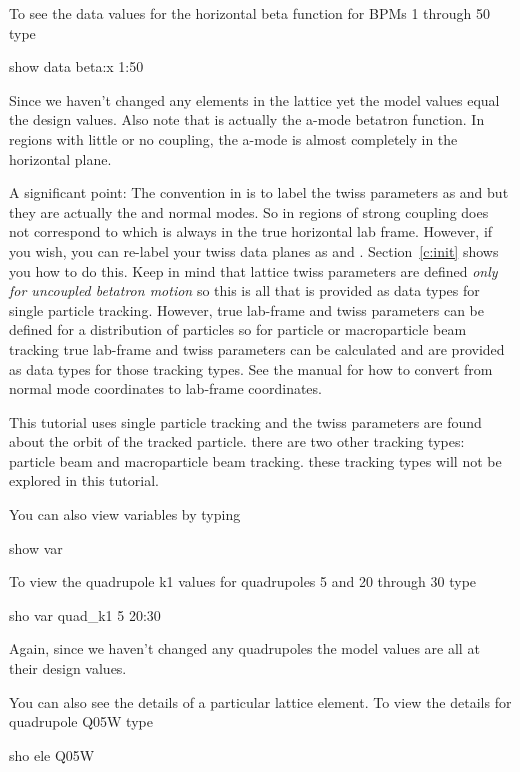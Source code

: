 To see the data values for the horizontal beta function for \cesr BPMs 1 through
50 type
\begin{example}
  show data beta:x 1:50
\end{example}
Since we haven't changed any elements in the lattice yet the model values equal
the design values. Also note that  is actually the a-mode betatron
function. In regions with little or no coupling, the a-mode is almost completely
in the horizontal plane.

A significant point: The convention in \bmad is to label the twiss parameters as
 and  but they are actually the  and  normal modes. So
in regions of strong coupling  does not correspond to 
which is always in the true horizontal lab frame.  However, if you wish, you can
re-label your twiss data planes as  and .  Section~\ref{c:init}
shows you how to do this. Keep in mind that lattice twiss parameters are defined
\textit{only for uncoupled betatron motion} so this is all that is provided as
data types for single particle tracking.  However, true lab-frame   and
 twiss parameters can be defined for a distribution of particles so for
particle or macroparticle beam tracking true lab-frame  and  twiss
parameters can be calculated and are provided as data types for those tracking
types. See the \bmad manual for how to convert from normal mode coordinates to
lab-frame coordinates.

This tutorial uses single particle tracking and the twiss parameters are found
about the orbit of the tracked particle. there are two other tracking types:
particle beam and macroparticle beam tracking. these tracking types will not be
explored in this tutorial.

You can also view variables by typing
\begin{example}
  show var
\end{example}
To view the quadrupole k1 values for \cesr quadrupoles 5  and 20 through 30 type
\begin{example}
  sho var quad\_k1 5 20:30
\end{example}
Again, since we haven't changed any quadrupoles the model values are all at their
design values.

You can also see the details of a particular lattice element. To view the details
for quadrupole Q05W type
\begin{example}
  sho ele Q05W
\end{example}


